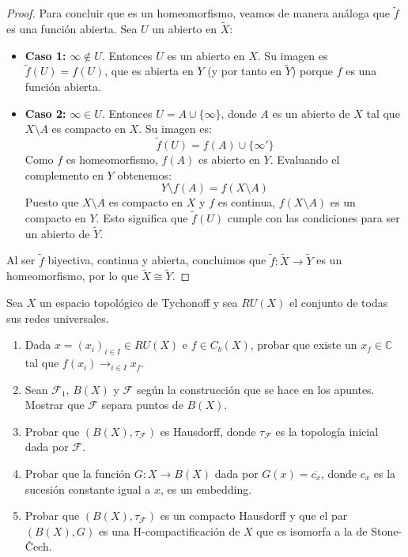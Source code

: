 \documentclass{article}
\theoremstyle{plain}
\theoremstyle{definition}
\newenvironment{ejercicio}[1]{\begin{trivlist}
\item[\hskip \labelsep {\bfseries Ejercicio}\hskip \labelsep {\bfseries #1.}]}{\end{trivlist}}
\begin{document}
\begin{proof}
    Para concluir que es un homeomorfismo, veamos de manera análoga que \( \tilde{f} \) es una función abierta. Sea \( U \) un abierto en \( \tilde{X} \):
    \begin{itemize}
        \item \textbf{Caso 1:} \( \infty \notin U \). Entonces \( U \) es un abierto en \( X \). Su imagen es \( \tilde{f}(U) = f(U) \), que es abierta en \( Y \) (y por tanto en \( \tilde{Y} \)) porque \( f \) es una función abierta.
        \item \textbf{Caso 2:} \( \infty \in U \). Entonces \( U = A \cup \{ \infty \} \), donde \( A \) es un abierto de \( X \) tal que \( X \setminus A \) es compacto en \( X \). Su imagen es:
              \[
                  \tilde{f}(U) = f(A) \cup \{ \infty' \}
              \]
              Como \( f \) es homeomorfismo, \( f(A) \) es abierto en \( Y \). Evaluando el complemento en \( Y \) obtenemos:
              \[
                  Y \setminus f(A) = f(X \setminus A)
              \]
              Puesto que \( X \setminus A \) es compacto en \( X \) y \( f \) es continua, \( f(X \setminus A) \) es un compacto en \( Y \). Esto significa que \( \tilde{f}(U) \) cumple con las condiciones para ser un abierto de \( \tilde{Y} \).
    \end{itemize}
    Al ser \( \tilde{f} \) biyectiva, continua y abierta, concluimos que \( \tilde{f} : \tilde{X} \to \tilde{Y} \) es un homeomorfismo, por lo que \( \tilde{X} \cong \tilde{Y} \).
\end{proof}

\begin{ejercicio}{14}
    Sea \( X \) un espacio topológico de Tychonoff y sea \( RU(X) \) el conjunto de todas sus redes universales.
    \begin{enumerate}
        \item[(a)] Dada \( x={(x_{i})}_{i\in I}\in RU(X) \) e \( f\in C_{b}(X) \), probar que existe un \( x_{f} \in \mathbb{C} \) tal que \( f(x_{i})\longrightarrow_{i\in I}x_{f} \).
        \item[(b)] Sean \( \mathcal{F}_{1} \), \( B(X) \) y \( \mathcal{F} \) según la construcción que se hace en los apuntes. Mostrar que \( \mathcal{F} \) separa puntos de \( B(X) \).
        \item[(c)] Probar que \( (B(X),\tau_{\mathcal{F}}) \) es Hausdorff, donde \( \tau_{\mathcal{F}} \) es la topología inicial dada por \( \mathcal{F} \).
        \item[(d)] Probar que la función \( G:X\rightarrow B(X) \) dada por \( G(x)=\overline{c_{x}} \), donde \( c_{x} \) es la sucesión constante igual a \( x \), es un embedding.
        \item[(e)] Probar que \( (B(X),\tau_{\mathcal{F}}) \) es un compacto Hausdorff y que el par \( (B(X),G) \) es una H-compactificación de \( X \) que es isomorfa a la de Stone-Čech.
    \end{enumerate}
\end{ejercicio}
\end{document}
